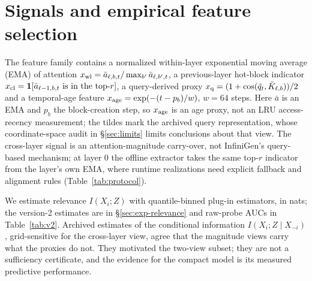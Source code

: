 \section{Signals and empirical feature selection}
\label{sec:signals}

The feature family contains a normalized within-layer exponential moving average
(EMA) of attention
$x_{\rm wl}=\bar a_{\ell,b,t}/\max_{b'}\bar a_{\ell,b',t}$, a previous-layer
hot-block indicator $x_{\rm cl}=\mathbf 1[\bar a_{\ell-1,b,t}\text{ is in the top-}r]$,
a query-derived proxy $x_{\rm q}=(1+\cos(\tilde q_t,\tilde K_{\ell,b}))/2$ and a
temporal-age feature $x_{\rm age}=\exp(-(t-p_b)/w)$, $w=64$ steps.
Here $\bar a$ is an EMA and $p_b$ the block-creation step, so $x_{\rm age}$ is an
age proxy, not an LRU access-recency measurement; the tildes mark the archived
query representation, whose coordinate-space audit in \S\ref{sec:limits} limits
conclusions about that view. The cross-layer signal is an attention-magnitude
carry-over, not InfiniGen's query-based mechanism; at layer 0 the offline extractor
takes the same top-$r$ indicator from the layer's own EMA, where runtime realizations
need explicit fallback and alignment rules (Table~\ref{tab:protocol}).

We estimate relevance $I(X_i;Z)$ with quantile-binned plug-in estimators, in nats;
the version-2 estimates are in \S\ref{sec:exp-relevance} and raw-probe AUCs in
Table~\ref{tab:v2}. Archived estimates of the conditional information
$I(X_i;Z\mid X_{-i})$, grid-sensitive for the cross-layer view, agree that the
magnitude views carry what the proxies do not. They motivated the two-view subset; they
are not a sufficiency certificate, and the evidence for the compact model is its
measured predictive performance.
